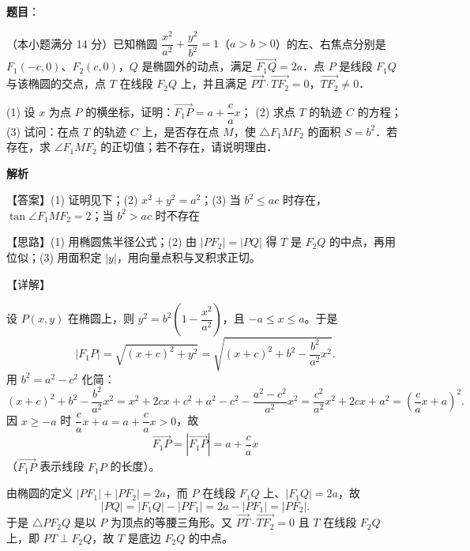 \begin{answer}

\textbf{题目}：

（本小题满分 14 分）已知椭圆 $\dfrac{x^2}{a^2} + \dfrac{y^2}{b^2} = 1$（$a > b > 0$）的左、右焦点分别是 $F_1(-c, 0)$、$F_2(c, 0)$，$Q$ 是椭圆外的动点，满足 $\overrightarrow{F_1Q} = 2a$．点 $P$ 是线段 $F_1Q$ 与该椭圆的交点，点 $T$ 在线段 $F_2Q$ 上，并且满足 $\overrightarrow{PT} \cdot \overrightarrow{TF_2} = 0$，$\overrightarrow{TF_2} \neq 0$．
\nopagebreak[4]
\begin{center}\end{center}
\nopagebreak[4]
(1) 设 $x$ 为点 $P$ 的横坐标，证明：$\overrightarrow{F_1P} = a + \dfrac{c}{a}x$；
(2) 求点 $T$ 的轨迹 $C$ 的方程；
(3) 试问：在点 $T$ 的轨迹 $C$ 上，是否存在点 $M$，使 $\triangle F_1MF_2$ 的面积 $S = b^2$．若存在，求 $\angle F_1MF_2$ 的正切值；若不存在，请说明理由．

\textbf{解析}

【答案】(1) 证明见下；(2) $x^2 + y^2 = a^2$；(3) 当 $b^2 \leqslant ac$ 时存在，$\tan\angle F_1MF_2 = 2$；当 $b^2 > ac$ 时不存在

【思路】(1) 用椭圆焦半径公式；(2) 由 $|PF_2| = |PQ|$ 得 $T$ 是 $F_2Q$ 的中点，再用位似；(3) 用面积定 $|y|$，用向量点积与叉积求正切。

【详解】


设 $P(x, y)$ 在椭圆上，则 $y^2 = b^2\left(1 - \dfrac{x^2}{a^2}\right)$，且 $-a \leqslant x \leqslant a$。于是
\nopagebreak[4]
\[
|F_1P| = \sqrt{(x+c)^2 + y^2} = \sqrt{(x+c)^2 + b^2 - \frac{b^2}{a^2}x^2}.
\]
用 $b^2 = a^2 - c^2$ 化简：
\nopagebreak[4]
\[
(x+c)^2 + b^2 - \frac{b^2}{a^2}x^2 = x^2 + 2cx + c^2 + a^2 - c^2 - \frac{a^2-c^2}{a^2}x^2 = \frac{c^2}{a^2}x^2 + 2cx + a^2 = \left(\frac{c}{a}x + a\right)^2.
\]
因 $x \geqslant -a$ 时 $\dfrac{c}{a}x + a = a + \dfrac{c}{a}x > 0$，故
\nopagebreak[4]
\[
\overrightarrow{F_1P} = \left|\overrightarrow{F_1P}\right| = a + \frac{c}{a}x
\]
（$\overrightarrow{F_1P}$ 表示线段 $F_1P$ 的长度）。


由椭圆的定义 $|PF_1| + |PF_2| = 2a$，而 $P$ 在线段 $F_1Q$ 上、$|F_1Q| = 2a$，故
\nopagebreak[4]
\[
|PQ| = |F_1Q| - |PF_1| = 2a - |PF_1| = |PF_2|.
\]
于是 $\triangle PF_2Q$ 是以 $P$ 为顶点的等腰三角形。又 $\overrightarrow{PT} \cdot \overrightarrow{TF_2} = 0$ 且 $T$ 在线段 $F_2Q$ 上，即 $PT \perp F_2Q$，故 $T$ 是底边 $F_2Q$ 的中点。


\end{answer}
